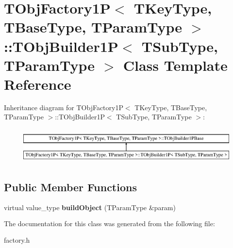 \hypertarget{class_t_obj_factory1_p_1_1_t_obj_builder1_p}{\section{T\+Obj\+Factory1\+P$<$ T\+Key\+Type, T\+Base\+Type, T\+Param\+Type $>$\+:\+:T\+Obj\+Builder1\+P$<$ T\+Sub\+Type, T\+Param\+Type $>$ Class Template Reference}
\label{class_t_obj_factory1_p_1_1_t_obj_builder1_p}
}
Inheritance diagram for T\+Obj\+Factory1\+P$<$ T\+Key\+Type, T\+Base\+Type, T\+Param\+Type $>$\+:\+:T\+Obj\+Builder1\+P$<$ T\+Sub\+Type, T\+Param\+Type $>$\+:\begin{figure}[H]
\begin{center}
\leavevmode
\includegraphics[height=1.904762cm]{class_t_obj_factory1_p_1_1_t_obj_builder1_p}
\end{center}
\end{figure}
\subsection*{Public Member Functions}
\begin{DoxyCompactItemize}
\item 
\hypertarget{class_t_obj_factory1_p_1_1_t_obj_builder1_p_a048e9487b62e7842560c332a1fd79b84}{virtual value\+\_\+type {\bfseries build\+Object} (T\+Param\+Type \&param)}\label{class_t_obj_factory1_p_1_1_t_obj_builder1_p_a048e9487b62e7842560c332a1fd79b84}

\end{DoxyCompactItemize}


The documentation for this class was generated from the following file\+:\begin{DoxyCompactItemize}
\item 
factory.\+h\end{DoxyCompactItemize}
